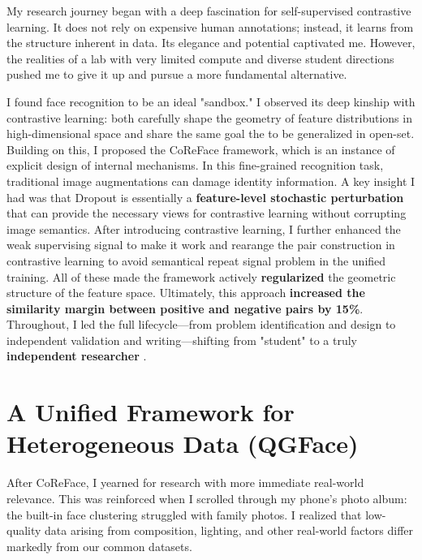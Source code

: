 \documentclass[11pt, letterpaper]{article}
\begin{document}
My research journey began with a deep fascination for self-supervised contrastive learning. It does not rely on expensive human annotations; instead, it learns from the structure inherent in data. Its elegance and potential captivated me. However, the realities of a lab with very limited compute and diverse student directions pushed me to give it up and pursue a more fundamental alternative.

I found face recognition to be an ideal "sandbox." I observed its deep kinship with contrastive learning: both carefully shape the geometry of feature distributions in high-dimensional space and share the same goal the to be generalized in open-set. Building on this, I proposed the CoReFace framework, which is an instance of explicit design of internal mechanisms. In this fine-grained recognition task, traditional image augmentations can damage identity information. A key insight I had was that Dropout is essentially a \textbf{feature-level stochastic perturbation} that can provide the necessary views for contrastive learning without corrupting image semantics. After introducing contrastive learning, I further enhanced the weak supervising signal to make it work and rearange the pair construction in contrastive learning to avoid semantical repeat signal problem in the unified training. All of these made the framework actively \textbf{regularized} the geometric structure of the feature space. Ultimately, this approach \textbf{increased the similarity margin between positive and negative pairs by 15\%}. Throughout, I led the full lifecycle—from problem identification and design to independent validation and writing—shifting from "student" to a truly \textbf{independent researcher} \cite{coreface}.

\section{A Unified Framework for Heterogeneous Data (QGFace)}

After CoReFace, I yearned for research with more immediate real-world relevance. This was reinforced when I scrolled through my phone's photo album: the built-in face clustering struggled with family photos. I realized that low-quality data arising from composition, lighting, and other real-world factors differ markedly from our common datasets.
\end{document}

